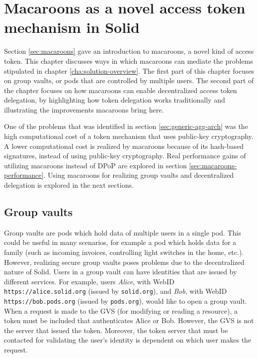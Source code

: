\chapter{Macaroons as a novel access token mechanism in Solid}
\label{cha:macaroons-solid}

Section \ref{sec:macaroons} gave an introduction to macaroons, a novel kind of access token. This chapter discusses ways in which macaroons can mediate the problems stipulated in chapter \ref{cha:solution-overview}. The first part of this chapter focuses on group vaults, or pods that are controlled by multiple users. The second part of the chapter focuses on how macaroons can enable decentralized access token delegation, by highlighting how token delegation works traditionally and illustrating the improvements macaroons bring here.

One of the problems that was identified in section \ref{sec:generic-agg-arch} was the high computational cost of a token mechanism that uses public-key cryptography. A lower computational cost is realized by macaroons because of its hash-based signatures, instead of using public-key cryptography. Real performance gains of utilizing macaroons instead of \gls{DPoP} are explored in section \ref{sec:macaroons-performance}. Using macaroons for realizing group vaults and decentralized delegation is explored in the next sections. 

\section{Group vaults}
\label{sec:group-vaults}
Group vaults are pods which hold data of multiple users in a single pod. This could be useful in many scenarios, for example a pod which holds data for a family (such as incoming invoices, controlling light switches in the home, etc.). However, realizing secure group vaults poses problems due to the decentralized nature of Solid. Users in a group vault can have identities that are issued by different services. For example, users \textit{Alice}, with WebID \texttt{https://alice.solid.org} (issued by \texttt{solid.org}), and \textit{Bob}, with WebID \texttt{https://bob.pods.org} (issued by \texttt{pods.org}), would like to open a group vault. When a request is made to the \acrfull{GVS} (for modifying or reading a resource), a token must be included that authenticates Alice or Bob. However, the \gls{GVS} is not the server that issued the token. Moreover, the token server that must be contacted for validating the user's identity is dependent on which user makes the request. 

